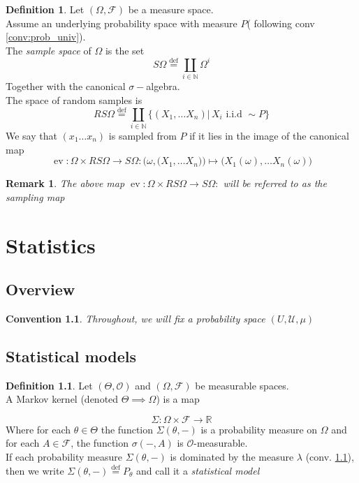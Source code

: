 \documentclass{book}
\theoremstyle{plain}
\newtheorem{convention}[corollary]{Convention}
\newtheorem{remark}[corollary]{Remark}
\theoremstyle{definition}
\newtheorem{definition}[corollary]{Definition}
\renewcommand{\d}[1]{\mathbb{#1}}
\newcommand{\define}{\stackrel{\operatorname{def}}{=}}
\newcommand{\fun}{\mapsto}
\DeclareMathOperator{\ev}{ev}
\newcommand{\mor}{\longrightarrow}
\renewcommand{\r}[1]{\mathcal{#1}}
\renewcommand{\r}[1]{\mathcal{#1}}
\begin{document}
\begin{definition}\label{def:sampling}
Let $(\Omega,\r{F})$ be a measure space.\\
Assume an underlying probability space with measure $P$( following conv \ref{conv:prob_univ}).\\
The \emph{sample space} of $\Omega$ is the set 
\[
S\Omega\define \coprod_{i \in \d{N}}\Omega^i
\]
Together with the canonical $\sigma-$algebra.\\
The space of random samples is
\[
RS\Omega\define  \coprod_{i \in \d{N}} \bigg\{(X_1,\ldots X_n)\vert \, X_i \textrm{ i.i.d }\sim P\bigg\}
\] 
We say that $(x_1\ldots x_n)$ is sampled from $P$ if it lies in the image of the canonical map
\[
\ev: \Omega\times RS\Omega\mor S\Omega: \bigg(\omega, \big(X_1,\ldots X_n\big)\bigg)\fun \bigg(X_1(\omega),\ldots X_n(\omega)\bigg)
\]
\end{definition}


\begin{remark}\label{rem:prob_sampling-map}
The above map $\ev: \Omega\times RS\Omega\mor S\Omega: $
will be referred to as the sampling map
\end{remark}
\chapter{Statistics}


\section{Overview}
\begin{convention}\label{conv:stats_univ-prob}
Throughout, we will fix a probability space $(U,\r{U},\mu)$
\end{convention}
\section{Statistical models}
\begin{definition}
Let $(\Theta, \r{O})$ and $(\Omega,\r{F})$ be measurable spaces.\\
A Markov kernel (denoted $\Theta\implies \Omega$) is a map

\[
\Sigma: \Omega \times \r{F}\mor \d{R}
\]
Where for each $\theta \in \Theta$ the function $\Sigma(\theta,-)$ is a probability measure on $\Omega$ and for each $A \in\r{F}$, the function $\sigma(-,A)$ is $\r{O}$-measurable.\\
If each probability measure $\Sigma(\theta,-)$ is dominated by the measure $\lambda$ (conv. \ref{conv:stats_univ-prob}), then we write $\Sigma(\theta,-)\define P_\theta$ and call it a \emph{statistical model}
\end{definition}
\end{document}

